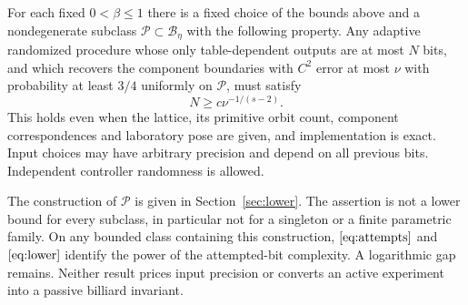 \begin{theorem}
\label{thm:lower}
For each fixed $0<\beta\le1$ there is a fixed choice of the bounds
above and a nondegenerate subclass $\mathcal P\subset\mathcal B_\eta$
with the following property. Any adaptive randomized procedure whose
only table-dependent outputs are at most $N$ bits, and which recovers
the component boundaries with $C^2$ error at most $\nu$ with probability
at least $3/4$ uniformly on $\mathcal P$, must satisfy
\begin{equation}\label{eq:lower}
                         N\ge c\nu^{-1/(s-2)}.
\end{equation}
This holds even when the lattice, its primitive orbit count, component
correspondences and laboratory pose are given, and implementation is
exact. Input choices may have arbitrary precision and depend on all
previous bits. Independent controller randomness is allowed.
\end{theorem}

The construction of $\mathcal P$ is given in Section~\ref{sec:lower}.
The assertion is not a lower bound for every subclass, in particular
not for a singleton or a finite parametric family. On any bounded class containing this construction, $\eqref{eq:attempts}$ and
$\eqref{eq:lower}$ identify the power of the attempted-bit complexity.
A logarithmic gap remains. Neither result prices input precision or
converts an active experiment into a passive billiard invariant.
